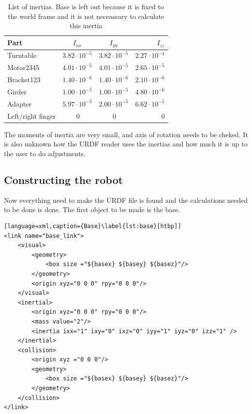 \begin{table}[htbp]
\centering
\caption{List of inertias. Base is left out because it is fixed to the world frame and it is not neceassary to calculate this inertia}
\label{table:inertia}
    \begin{tabular}{l c c r}
        \toprule
        Part  &  $I_{xx}$ & $I_{yy}$ & $I_{zz}$\\
        \midrule
        Turntable & $3.82\cdot10^{-5}$ &  $3.82\cdot10^{-5}$ &$2.27\cdot10^{-4}$\\
        Motor2345 & $4.01\cdot10^{-5}$  & $4.01\cdot10^{-5}$  & $2.65\cdot10^{-5}$ \\
        Bracket123 & $1.40\cdot10^{-6} $ & $1.40\cdot10^{-6} $ & $2.10\cdot10^{-6} $ \\
        Girder & $1.00\cdot10^{-5} $ & $1.00\cdot10^{-5} $ & $4.80\cdot10^{-6} $\\
        Adapter & $5.97\cdot10^{-5} $ & $2.00\cdot10^{-5} $ & $6.62\cdot10^{-5} $\\
        Left/right finger & $~0$ & $~0$ & $~0$\\
        \bottomrule
    \end{tabular}
\end{table}

The moments of inertia are very small, and axis of rotation needs to be cheked. It is also unknown how the URDF reader uses the inertias and how much it is up to the user to do adjustments. 

\subsection*{Constructing the robot}
Now everything need to make the URDF file is found and the calculations needed to be done is done. The first object to be made is the base. 

\begin{lstlisting}[language=xml,caption={Base}\label{lst:base}[htbp]]
<link name="base_link">
    <visual>
        <geometry>
            <box size ="${basex} ${basey} ${basez}"/>
        </geometry>
        <origin xyz="0 0 0" rpy="0 0 0"/>
    </visual>
    <inertial>
        <origin xyz="0 0 0" rpy="0 0 0"/>
        <mass value="2"/>
        <inertia ixx="1" ixy="0" ixz="0" iyy="1" iyz="0" izz="1" />
    </inertial>
    <collision>
        <origin xyz ="0 0 0"/>
        <geometry>
            <box size ="${basex} ${basey} ${basez}"/>
        </geometry>
    </collision>
</link>
\end{lstlisting}

